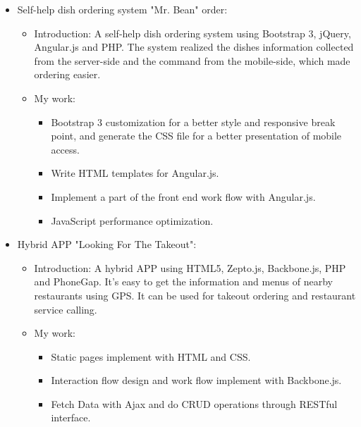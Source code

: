 \documentclass[11pt,a4paper,sans]{moderncv}        %
\begin{document}
{\begin{itemize}
\begin{itemize}
      \begin{itemize}%
        \item Mobile first and responsive design using HTML and CSS.
        \item Work flow design with Backbone.js.
        \item Algorithm implement of game rules with Underscore.js.
        \item Using pushstream.js and Nginx configurations to implement the function of html message push(such as Long polling, Web Socket and so on) in order to simulate the instant communications in multi-player games.
      \end{itemize}
  \end{itemize}
\item Self-help dish ordering system "Mr. Bean" order:
  \begin{itemize}%
  \item Introduction: A self-help dish ordering system using Bootstrap 3, jQuery, Angular.js and PHP. The system realized the dishes information collected from the server-side and the command from the mobile-side, which made ordering easier.
  \item My work:
      \begin{itemize}%
        \item Bootstrap 3 customization for a better style and responsive break point, and generate the CSS file for a better presentation of mobile access.
        \item Write HTML templates for Angular.js.
        \item Implement a part of the front end work flow with Angular.js.
        \item JavaScript performance optimization.
      \end{itemize}
  \end{itemize}
\item Hybrid APP "Looking For The Takeout":
  \begin{itemize}%
  \item Introduction: A hybrid APP using HTML5, Zepto.js, Backbone.js, PHP and PhoneGap. It's easy to get the information and menus of nearby restaurants using GPS. It can be used for takeout ordering and restaurant service calling.
  \item My work:
      \begin{itemize}%
        \item Static pages implement with HTML and CSS.
        \item Interaction flow design and work flow implement with Backbone.js.
        \item Fetch Data with Ajax and do CRUD operations through RESTful interface.
      \end{itemize}
  \end{itemize}
\end{itemize}}
\end{document}
